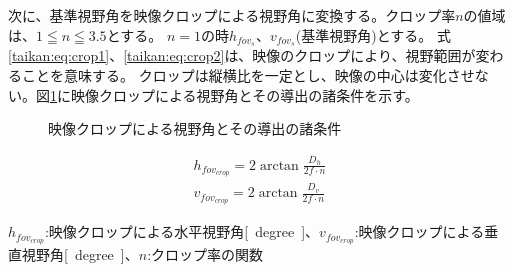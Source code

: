 次に、基準視野角を映像クロップによる視野角に変換する。クロップ率$n$の値域は、$1 \leqq n \leqq 3.5$とする。
$n = 1$の時$h_{fov_s}$、$v_{fov_s}$(基準視野角)とする。
式\eqref{taikan:eq:crop1}、\eqref{taikan:eq:crop2}は、映像のクロップにより、視野範囲が変わることを意味する。
クロップは縦横比を一定とし、映像の中心は変化させない。図\ref{taikan:shiyatocrop}に映像クロップによる視野角とその導出の諸条件を示す。
\clearpage
\begin{figure}[h]
  \begin{center}
  \caption{映像クロップによる視野角とその導出の諸条件}
  \label{taikan:shiyatocrop}
  \end{center}
\end{figure}

\begin{align}
  h_{fov_{crop}} = 2\arctan{\frac{D_h}{2f\cdot n}} \label{taikan:eq:crop1}\\
  v_{fov_{crop}} = 2\arctan{\frac{D_v}{2f\cdot n}} \label{taikan:eq:crop2}
\end{align}

$h_{fov_{crop}}$:映像クロップによる水平視野角\si{[degree]}、$v_{fov_{crop}}$:映像クロップによる垂直視野角\si{[degree]}、$n$:クロップ率の関数

